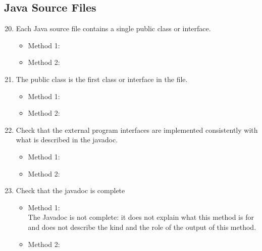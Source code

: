 \subsection{Java Source Files}
\begin{enumerate}
\setcounter{enumi}{19}
	\item Each Java source file contains a single public class or interface.
	\begin{itemize}
	 	\item Method 1: \cmark
 		\item Method 2: 
	\end{itemize}
	\item The public class is the first class or interface in the file.
	\begin{itemize}
	 	\item Method 1: \cmark
 		\item Method 2: 
	\end{itemize}
	\item Check that the external program interfaces are implemented consistently with what is described in the javadoc.
	\begin{itemize}
	 	\item Method 1: \cmark
 		\item Method 2: 
	\end{itemize}
	\item Check that the javadoc is complete
	\begin{itemize}
	 	\item Method 1: \xmark\\
	 	The Javadoc is not complete: it does not explain what this method is for and does not describe the kind and the role of the output of this method.
 		\item Method 2: 
	\end{itemize}
\end{enumerate}